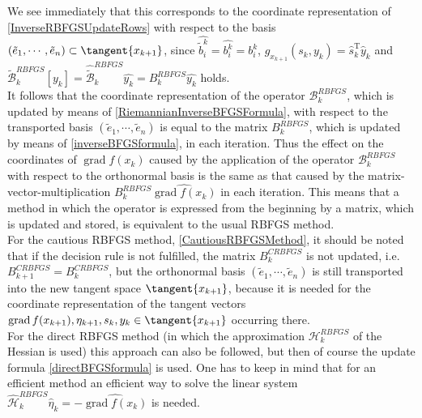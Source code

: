 We see immediately that this corresponds to the coordinate representation of \cref{InverseRBFGSUpdateRows} with respect to the basis $(\tilde{e}_1, \cdots, \tilde{e}_n) \subset \tangent{x_{k+1}}$, since $\hat{\widetilde{b}^{k}_i} = \hat{b^{k}_i} = b^{k}_i$, $g_{x_{k+1}}(s_k, y_k) = \hat{s}^{\mathrm{T}}_k \hat{y}_k$ and $\widehat{\widetilde{\mathcal{B}}^{RBFGS}_k [y_k]} = \hat{\widetilde{\mathcal{B}}}^{RBFGS}_k \hat{y_k} = B^{RBFGS}_k \hat{y_k}$ holds. \\
It follows that the coordinate representation of the operator $\mathcal{B}^{RBFGS}_k$, which is updated by means of \cref{RiemannianInverseBFGSFormula}, with respect to the transported basis $(\tilde{e}_1, \cdots, \tilde{e}_n)$ is equal to the matrix $B^{RBFGS}_k$, which is updated by means of \cref{inverseBFGSformula}, in each iteration. Thus the effect on the coordinates of $\operatorname{grad} f(x_k)$ caused by the application of the operator $\mathcal{B}^{RBFGS}_k$ with respect to the orthonormal basis is the same as that caused by the matrix-vector-multiplication $B^{RBFGS}_k \widehat{\operatorname{grad} f(x_k)}$ in each iteration. This means that a method in which the operator is expressed from the beginning by a matrix, which is updated and stored, is equivalent to the usual RBFGS method. \\

For the cautious RBFGS method, \cref{CautiousRBFGSMethod}, it should be noted that if the decision rule is not fulfilled, the matrix $B^{CRBFGS}_k$ is not updated, i.e. $B^{CRBFGS}_{k+1} = B^{CRBFGS}_k$, but the orthonormal basis $(\tilde{e}_1, \cdots, \tilde{e}_n)$ is still transported into the new tangent space $\tangent{x_{k+1}}$, because it is needed for the coordinate representation of the tangent vectors $\operatorname{grad} f(x_{k+1}), \eta_{k+1}, s_{k}, y_{k} \in \tangent{x_{k+1}}$ occurring there. \\
For the direct RBFGS method (in which the approximation $\mathcal{H}^{RBFGS}_k$ of the Hessian is used) this approach can also be followed, but then of course the update formula \cref{directBFGSformula} is used. One has to keep in mind that for an efficient method an efficient way to solve the linear system $\hat{\mathcal{H}}^{RBFGS}_k \hat{\eta}_k = -\widehat{\operatorname{grad} f(x_k)}$ is needed. 

